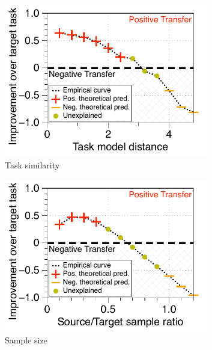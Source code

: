 \begin{figure}[!t]
	\begin{subfigure}[b]{0.32\textwidth}
		\centering
		\includegraphics[width=0.98\textwidth]{figures/model_shift_phase_transition.pdf}
		\caption{Task similarity}
		\label{fig_model_shift}
	\end{subfigure}\hfill
	\begin{subfigure}[b]{0.32\textwidth}
		\centering
		\includegraphics[width=0.98\textwidth]{figures/datapoints_phase_transition.pdf}
		\caption{Sample size}
		\label{fig_size}
	\end{subfigure}\hfill
	\begin{subfigure}[b]{0.32\textwidth}
		\centering

\end{subfigure}
\end{figure}
